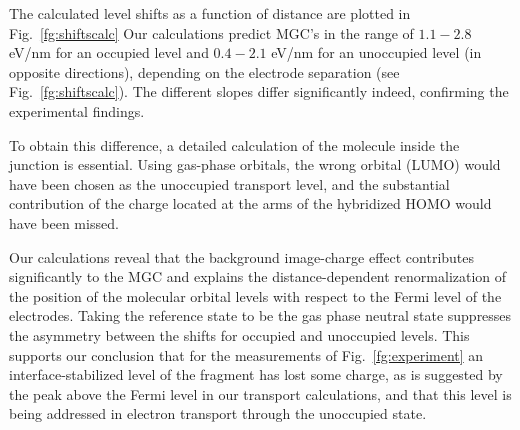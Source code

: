 \documentclass[aip,jcp,a4paper,reprint,floatfix,superscriptaddress]{revtex4-1}
\begin{document}
The calculated level shifts as a function of distance are plotted in Fig.~\ref{fg:shiftscalc} 
Our calculations predict MGC's in the range of 
$1.1-2.8$ eV/nm for an occupied level and
$0.4-2.1$ eV/nm for an unoccupied level 
(in opposite directions), depending on the electrode separation (see Fig.~\ref{fg:shiftscalc}).
The different slopes differ significantly indeed, confirming the experimental findings. 

To obtain this difference, a detailed calculation of the molecule inside the junction is essential. Using gas-phase orbitals, the wrong orbital
(LUMO) would have been chosen as the unoccupied transport level, and the substantial contribution of the charge located at the arms of the hybridized 
HOMO would have been missed. 



Our calculations reveal that the background image-charge effect contributes significantly to the MGC and explains the distance-dependent renormalization of the position of the molecular orbital levels with respect to the Fermi level of the electrodes. 
Taking the reference state to be the gas phase neutral state suppresses the asymmetry between the shifts for occupied and unoccupied levels. %
This supports our conclusion that for the measurements of Fig.~\ref{fg:experiment} an interface-stabilized level of the fragment has lost some charge, as is suggested by the peak above the Fermi level in our transport calculations, and that this level is being addressed in electron transport through the unoccupied state.
\end{document}
